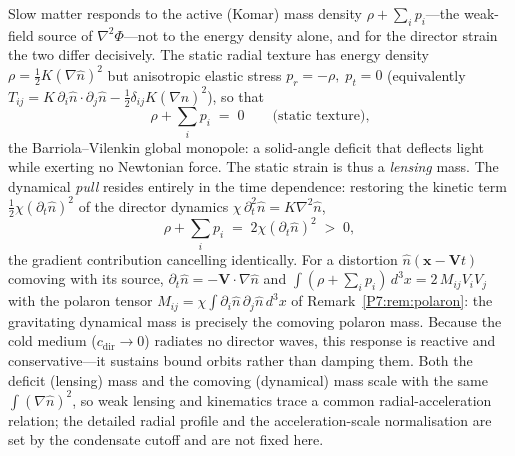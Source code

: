 \begin{remark}
\label{P7:rem:active_mass}
Slow matter responds to the active (Komar) mass density
$\rho+\sum_i p_i$---the weak-field source of $\nabla^2\Phi$---not to the
energy density alone, and for the director strain the two differ
decisively.  The static radial texture has energy density
$\rho=\tfrac12 K(\nabla\hat n)^2$ but anisotropic elastic stress
$p_r=-\rho,\;p_t=0$ (equivalently
$T_{ij}=K\,\partial_i\hat n\!\cdot\!\partial_j\hat n
       -\tfrac12\delta_{ij}K(\nabla\hat n)^2$), so that
\begin{equation}
  \rho+\sum_i p_i \;=\; 0 \qquad\text{(static texture),}
  \label{P7:eq:monopole}
\end{equation}
the Barriola--Vilenkin global monopole: a solid-angle deficit that
deflects light while exerting no Newtonian force.  The static strain is
thus a \emph{lensing} mass.  The dynamical \emph{pull} resides entirely
in the time dependence: restoring the kinetic term
$\tfrac12\chi(\partial_t\hat n)^2$ of the director dynamics
$\chi\,\partial_t^2\hat n=K\nabla^2\hat n$,
\begin{equation}
  \rho+\sum_i p_i \;=\; 2\chi(\partial_t\hat n)^2 \;>\;0,
  \label{P7:eq:kinetic_mass}
\end{equation}
the gradient contribution cancelling identically.  For a distortion
$\hat n(\mathbf x-\mathbf V t)$ comoving with its source,
$\partial_t\hat n=-\mathbf V\!\cdot\!\nabla\hat n$ and
$\int(\rho+\sum_i p_i)\,d^3x = 2\,M_{ij}V_iV_j$ with the polaron tensor
$M_{ij}=\chi\int\partial_i\hat n\,\partial_j\hat n\,d^3x$ of
Remark~\ref{P7:rem:polaron}: the gravitating dynamical mass is
precisely the comoving polaron mass.  Because the cold medium
($c_{\mathrm{dir}}\to0$) radiates no director waves, this response is
reactive and conservative---it sustains bound orbits rather than
damping them.  Both the deficit (lensing) mass and the comoving
(dynamical) mass scale with the same $\int(\nabla\hat n)^2$, so weak
lensing and kinematics trace a common radial-acceleration relation; the
detailed radial profile and the acceleration-scale normalisation are
set by the condensate cutoff and are not fixed here.
\end{remark}

